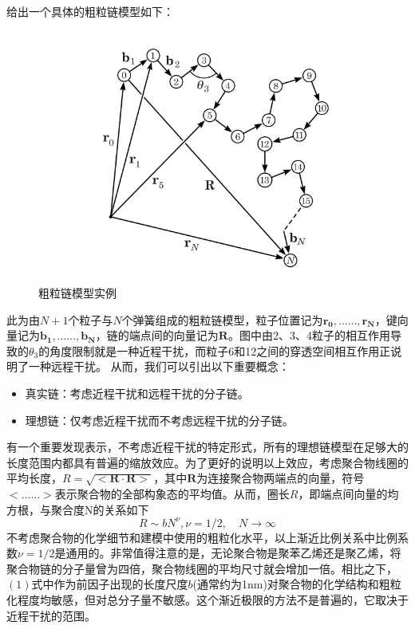 给出一个具体的粗粒链模型如下：

\begin{figure}[h]
\centering
\includegraphics[scale=0.5
]{./figures/2-1.png}
\caption{粗粒链模型实例}
\end{figure}

此为由$N+1$个粒子与$N$个弹簧组成的粗粒链模型，粒子位置记为$\mathbf{r_0},……,\mathbf{r_N}$，键向量记为$\mathbf{b_1},……,\mathbf{b_N}$，链的端点间的向量记为$\mathbf{R}$。图中由2、3、4粒子的相互作用导致的$\theta_3$的角度限制就是一种近程干扰，而粒子6和12之间的穿透空间相互作用正说明了一种远程干扰。
从而，我们可以引出以下重要概念：
\begin{itemize}
	\item 真实链：考虑近程干扰和远程干扰的分子链。
	\item 理想链：仅考虑近程干扰而不考虑远程干扰的分子链。
\end{itemize}

有一个重要发现表示，不考虑近程干扰的特定形式，所有的理想链模型在足够大的长度范围内都具有普遍的缩放效应。为了更好的说明以上效应，考虑聚合物线圈的平均长度，$R=\sqrt{<\mathbf{R}\cdot \mathbf{R}>}$，其中$\mathbf{R}$为连接聚合物两端点的向量，符号$<……>$表示聚合物的全部构象态的平均值。从而，圈长$R$，即端点间向量的均方根，与聚合度N的关系如下
\begin{equation}
R \sim b N ^ { \nu } , \nu = 1 / 2 , \quad N \rightarrow \infty
\end{equation}
不考虑聚合物的化学细节和建模中使用的粗粒化水平，以上渐近比例关系中比例系数$\nu = 1/2$是通用的。非常值得注意的是，无论聚合物是聚苯乙烯还是聚乙烯，将聚合物链的分子量曾为四倍，聚合物线圈的平均尺寸就会增加一倍。相比之下，$(1)$式中作为前因子出现的长度尺度$b$(通常约为1nm)对聚合物的化学结构和粗粒化程度均敏感，但对总分子量不敏感。这个渐近极限的方法不是普遍的，它取决于近程干扰的范围。

